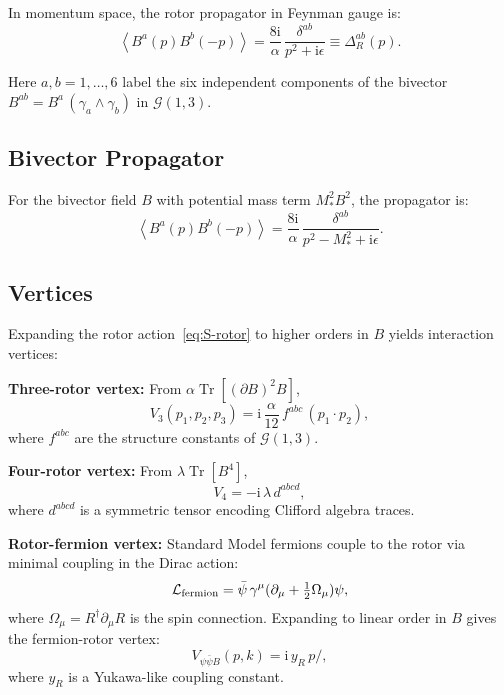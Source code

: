 \documentclass[11pt,a4paper]{article}
\numberwithin{equation}{section}
\theoremstyle{plain}
\theoremstyle{definition}
\theoremstyle{remark}
\DeclareMathOperator{\Tr}{Tr}
\newcommand{\ii}{\mathrm{i}}
\newcommand{\avg}[1]{\left\langle #1 \right\rangle}
\newcommand{\Cl}{\mathcal{G}}               %
\newcommand{\Lag}{\mathcal{L}}              %
\begin{document}
In momentum space, the rotor propagator in Feynman gauge is:
\begin{equation}
\avg{B^a(p)B^b(-p)} = \frac{8\ii}{\alpha}\,\frac{\delta^{ab}}{p^2+\ii\epsilon} \equiv \Delta_R^{ab}(p).
\label{eq:prop-rotor}
\end{equation}

Here $a,b=1,\ldots,6$ label the six independent components of the bivector $B^{ab}=B^a\,(\gamma_a\wedge\gamma_b)$ in $\Cl(1,3)$.

\subsection{Bivector Propagator}

For the bivector field $B$ with potential mass term $M_*^2 B^2$, the propagator is:
\begin{equation}
\avg{B^a(p)B^b(-p)} = \frac{8\ii}{\alpha}\,\frac{\delta^{ab}}{p^2 - M_*^2 + \ii\epsilon}.
\label{eq:prop-bivector}
\end{equation}

\subsection{Vertices}

Expanding the rotor action~\eqref{eq:S-rotor} to higher orders in $B$ yields interaction vertices:

\textbf{Three-rotor vertex:} From $\alpha\Tr[(\partial B)^2 B]$,
\begin{equation}
V_3(p_1,p_2,p_3) = \ii\,\frac{\alpha}{12}\,f^{abc}\,(p_1\cdot p_2),
\label{eq:V3}
\end{equation}
where $f^{abc}$ are the structure constants of $\Cl(1,3)$.

\textbf{Four-rotor vertex:} From $\lambda\Tr[B^4]$,
\begin{equation}
V_4 = -\ii\,\lambda\,d^{abcd},
\label{eq:V4}
\end{equation}
where $d^{abcd}$ is a symmetric tensor encoding Clifford algebra traces.

\textbf{Rotor-fermion vertex:} Standard Model fermions couple to the rotor via minimal coupling in the Dirac action:
\begin{equation}
\Lag_{\rm fermion} = \bar\psi\,\gamma^\mu(\partial_\mu + \tfrac12 \Omega_\mu)\psi,
\label{eq:L-fermion}
\end{equation}
where $\Omega_\mu = R^\dagger \partial_\mu R$ is the spin connection. Expanding to linear order in $B$ gives the fermion-rotor vertex:
\begin{equation}
V_{\psi\bar\psi B}(p,k) = \ii\,y_R\,p\!\!\!/,
\label{eq:V-fermion}
\end{equation}
where $y_R$ is a Yukawa-like coupling constant.
\end{document}
